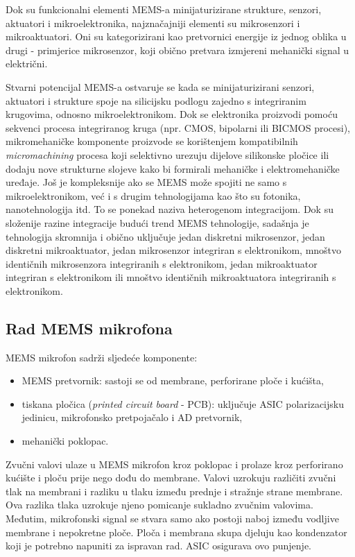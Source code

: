 Dok su funkcionalni elementi MEMS-a minijaturizirane strukture, senzori, aktuatori i mikroelektronika, najznačajniji elementi su mikrosenzori i mikroaktuatori. Oni su  kategorizirani kao pretvornici energije iz jednog oblika u drugi - primjerice mikrosenzor, koji obično pretvara izmjereni mehanički signal u električni.

Stvarni potencijal MEMS-a ostvaruje se kada se minijaturizirani senzori, aktuatori i strukture spoje na silicijsku podlogu zajedno s integriranim krugovima, odnosno mikroelektronikom. Dok se elektronika proizvodi pomoću sekvenci procesa integriranog kruga (npr. CMOS, bipolarni ili BICMOS procesi), mikromehaničke komponente proizvode se korištenjem kompatibilnih \textit{micromachining} procesa koji selektivno urezuju dijelove silikonske pločice ili dodaju nove strukturne slojeve kako bi formirali mehaničke i elektromehaničke uređaje. Još je kompleksnije ako se MEMS može spojiti ne samo s mikroelektronikom, već i s drugim tehnologijama kao što su fotonika, nanotehnologija itd. To se ponekad naziva heterogenom integracijom. Dok su složenije razine integracije budući trend MEMS tehnologije, sadašnja je tehnologija skromnija i obično uključuje jedan diskretni mikrosenzor, jedan diskretni mikroaktuator, jedan mikrosenzor integriran s elektronikom, mnoštvo identičnih mikrosenzora integriranih s elektronikom, jedan mikroaktuator integriran s elektronikom ili mnoštvo identičnih mikroaktuatora integriranih s elektronikom. 
 

\subsection{Rad MEMS mikrofona}

MEMS mikrofon sadrži sljedeće komponente:
\begin{itemize}
	\item MEMS pretvornik: sastoji se od membrane, perforirane ploče i kućišta,
	\item tiskana pločica (\textit{printed circuit board} - PCB): uključuje ASIC polarizacijsku jedinicu, mikrofonsko pretpojačalo i AD pretvornik,
	\item mehanički poklopac.
\end{itemize}

Zvučni valovi ulaze u MEMS mikrofon kroz poklopac i prolaze kroz perforirano kućište i ploču prije nego dođu do membrane. Valovi uzrokuju različiti zvučni tlak na membrani i razliku u tlaku između prednje i stražnje strane membrane. Ova razlika tlaka uzrokuje njeno pomicanje sukladno zvučnim valovima. Međutim, mikrofonski signal se stvara samo ako postoji naboj između vodljive membrane i nepokretne ploče. Ploča i membrana skupa djeluju kao kondenzator koji je potrebno napuniti za ispravan rad. ASIC osigurava ovo punjenje.

